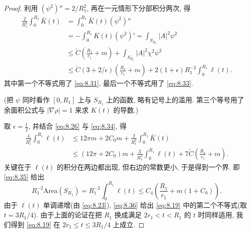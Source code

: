 \begin{proof}
利用 $(\psi^2)''=2/R_1^2$, 再在一元情形下分部积分两次, 得
\begin{equation}
\begin{aligned}
\frac2{R_1^2}\int_0^{R_1}\bar K(t)
&=\int_0^{R_1}\bar K(t)(\psi^2)''\\
&=-\int_0^{R_1}K(t)(\psi^2)'
=\int_{S_{R_1}}|A|^2\psi^2\\
&\leq\tilde C\left(\frac{R_1}{r_1}+m\right)
+\int_{S_{R_1}}|A|^2\chi^2\psi^2\\
&\leq\tilde C(3+2/\epsilon)\left(\frac{R_1}{r_1}+m\right)
+2(1+\epsilon)R_1^{-2}\int_0^{R_1}\ell(t).
\label{eq:8.34}
\end{aligned}
\end{equation}
其中第一个不等式用了 \eqref{eq:8.31}, 最后一个不等式用了
\eqref{eq:8.33}.

(把 $\psi$ 同时看作 $[0,R_1]$ 上与 $S_{R_1}$ 上的函数, 略有记号上的滥用.
第三个等号用了余面积公式与 $|\nabla\rho|=1$ 来求 $K(t)$ 的导数.)

取 $\epsilon=\frac12$, 并结合 \eqref{eq:8.26} 与 \eqref{eq:8.34}, 得
\begin{equation}
\begin{aligned}
\frac4{R_1^2}\int_0^{R_1}\ell(t)
&\leq12\pi m+2C_0m+\frac2{R_1^2}\int_0^{R_1}\bar K(t)\\
&\leq(12\pi+2C_0)m+\frac3{R_1^2}\int_0^{R_1}\ell(t)
+7\tilde C\left(\frac{R_1}{r_1}+m\right).
\label{eq:8.35}
\end{aligned}
\end{equation}
关键在于 $\ell(t)$ 的积分在两边都出现, 但右边的常数更小, 于是得到一个界.
即 \eqref{eq:8.35} 给出
\begin{equation}
R_1^{-2}\mathrm{Area}(S_{R_1})
=R_1^{-2}\int_0^{R_1}\ell(t)
\leq C_4\left(\frac{R_1}{r_1}+m(1+C_0)\right).
\label{eq:8.36}
\end{equation}
由于 $\ell(t)$ 单调递增(由 \eqref{eq:8.23}), \eqref{eq:8.36} 给出
\eqref{eq:8.19} 中的第二个不等式(取 $t=3R_1/4$). 由于上面的论证在把
$R_1$ 换成满足 $2r_1<t<R_1$ 的 $t$ 时同样适用, 我们得到 \eqref{eq:8.19}
在 $2r_1\leq t\leq3R_1/4$ 上成立.


\end{proof}
